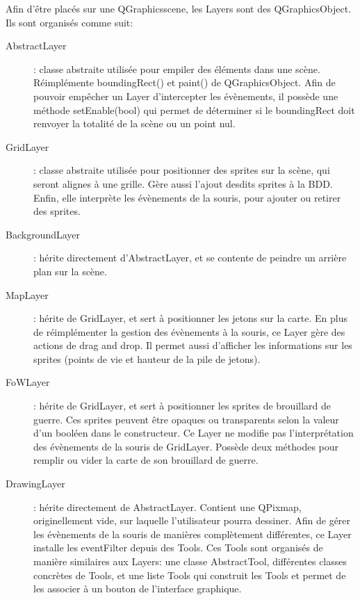 Afin d'être placés sur une QGraphicsscene, les Layers sont des QGraphicsObject. Ils sont organisés comme suit:
\begin{description}
	\item[AbstractLayer]: classe abstraite utilisée pour empiler des éléments dans une scène. Réimplémente boundingRect() et paint() de QGraphicsObject. Afin de pouvoir empêcher un Layer d'intercepter les évènements, il possède une méthode setEnable(bool) qui permet de déterminer si le boundingRect doit renvoyer la totalité de la scène ou un point nul.
	\item[GridLayer]: classe abstraite utilisée pour positionner des sprites sur la scène, qui seront alignes à une grille. Gère aussi l'ajout desdits sprites à la BDD. Enfin, elle interprète les évènements de la souris, pour ajouter ou retirer des sprites.
	\item[BackgroundLayer]: hérite directement d'AbstractLayer, et se contente de peindre un arrière plan sur la scène.
	\item[MapLayer]: hérite de GridLayer, et sert à positionner les jetons sur la carte. En plus de réimplémenter la gestion des évènements à la souris, ce Layer gère des actions de drag and drop. Il  permet aussi d'afficher les informations sur les sprites (points de vie et hauteur de la pile de jetons).
	\item[FoWLayer]: hérite de GridLayer, et sert à positionner les sprites de brouillard de guerre. Ces sprites peuvent être opaques ou transparents selon la valeur d'un booléen dans le constructeur. Ce Layer ne modifie pas l'interprétation des évènements de la souris de GridLayer. Possède deux méthodes pour remplir ou vider la carte de son brouillard de guerre. 
	\item[DrawingLayer]: hérite directement de AbstractLayer. Contient une QPixmap, originellement vide, sur laquelle l'utilisateur pourra dessiner. Afin de gérer les évènements de la souris de manières complètement différentes, ce Layer installe les eventFilter depuis des Tools. Ces Tools sont organisés de manière similaires aux Layers: une classe AbstractTool, différentes classes concrètes de Tools, et une liste Tools qui construit les Tools et permet de les associer à un bouton de l'interface graphique.
\end{description}